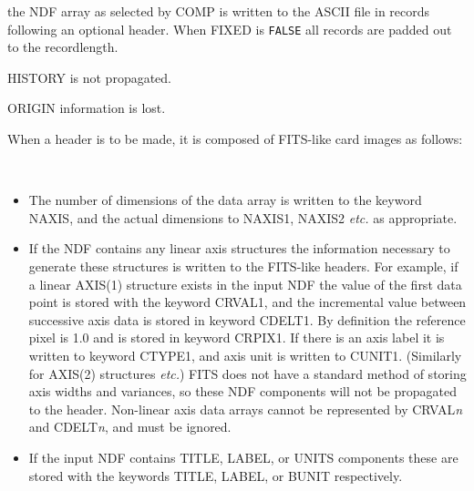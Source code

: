 \documentclass[twoside,11pt]{article}
\newcommand{\latex}[1]{#1}
\newcommand{\ssthitemlist}[1]{
  \latex{
  \mbox{} \\
  \vspace{-3.5ex}
  }
  \begin{itemize}
     #1
  \end{itemize}
}
\newcommand{\sstitem}{\item}
\newcommand{\sstitem}{\item}
\begin{document}
{{{         \sstitem
            the NDF array as selected by COMP is written to the ASCII
            file in records following an optional header.  When FIXED is
            \texttt{FALSE} all records are padded out to the recordlength.

         \sstitem
            HISTORY is not propagated.

         \sstitem
            ORIGIN information is lost.

         \sstitem
            When a header is to be made, it is composed of FITS-like card
            images as follows:
         \ssthitemlist{

            \sstitem
               The number of dimensions of the data array is written
               to the keyword NAXIS, and the actual dimensions to NAXIS1,
               NAXIS2 {\it etc.} as appropriate.

            \sstitem
               If the NDF contains any linear axis structures the
               information necessary to generate these structures is
               written to the FITS-like headers. For example, if a linear
               AXIS(1) structure exists in the input NDF the value of the
               first data point is stored with the keyword CRVAL1,
               and the incremental value between successive axis data is
               stored in keyword CDELT1.  By definition the reference pixel is
               1.0 and is stored in keyword CRPIX1.  If there is an axis label
               it is written to keyword CTYPE1, and axis unit is written to CUNIT1.
               (Similarly for AXIS(2) structures {\it etc.}) FITS does not have
               a standard method of storing axis widths and variances, so these
               NDF components will not be propagated to the header.
               Non-linear axis data arrays cannot be represented by CRVAL{\em{n}}
               and CDELT{\em{n}}, and must be ignored.

            \sstitem
               If the input NDF contains TITLE, LABEL, or UNITS components
               these are stored with the keywords TITLE, LABEL, or BUNIT
               respectively.

}}}}
\end{document}
